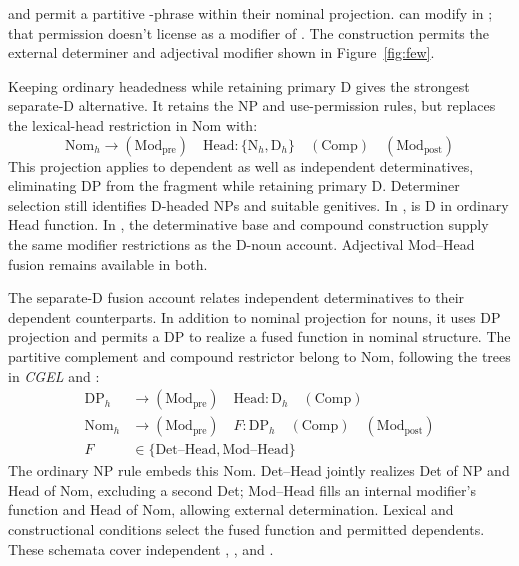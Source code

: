 \documentclass[12pt]{article}
\begin{document}
 and  permit a partitive -phrase within their nominal projection.  can modify  in ; that permission doesn't license  as a modifier of . The construction  permits the external determiner and adjectival modifier shown in Figure~\ref{fig:few}.

Keeping ordinary headedness while retaining primary D gives the strongest separate-D alternative. It retains the NP and use-permission rules, but replaces the lexical-head restriction in Nom with:
\[
\mathrm{Nom}_{h}\to(\mathrm{Mod}_{\mathrm{pre}})\quad\mathrm{Head}:\{\mathrm{N}_{h},\mathrm{D}_{h}\}\quad(\mathrm{Comp})\quad(\mathrm{Mod}_{\mathrm{post}})
\]
This projection applies to dependent as well as independent determinatives, eliminating DP from the fragment while retaining primary D. Determiner selection still identifies D-headed NPs and suitable genitives. In ,  is D in ordinary Head function. In , the determinative base and compound construction supply the same modifier restrictions as the D-noun account. Adjectival Mod--Head fusion remains available in both.

The separate-D fusion account relates independent determinatives to their dependent counterparts. In addition to nominal projection for nouns, it uses DP projection and permits a DP to realize a fused function in nominal structure. The partitive complement and compound restrictor belong to Nom, following the trees in \textit{CGEL} and \textcite[582]{Payne2007}:
\[
\begin{aligned}
\mathrm{DP}_{h} &\to (\mathrm{Mod}_{\mathrm{pre}})\quad \mathrm{Head}:\mathrm{D}_{h}\quad (\mathrm{Comp}) \\
\mathrm{Nom}_{h} &\to (\mathrm{Mod}_{\mathrm{pre}})\quad F:\mathrm{DP}_{h}\quad (\mathrm{Comp})\quad (\mathrm{Mod}_{\mathrm{post}}) \\
F&\in\{\mathrm{Det\text{--}Head},\mathrm{Mod\text{--}Head}\}
\end{aligned}
\]
The ordinary NP rule embeds this Nom. Det--Head jointly realizes Det of NP and Head of Nom, excluding a second Det; Mod--Head fills an internal modifier's function and Head of Nom, allowing external determination. Lexical and constructional conditions select the fused function and permitted dependents. These schemata cover independent , ,  and .
\end{document}
